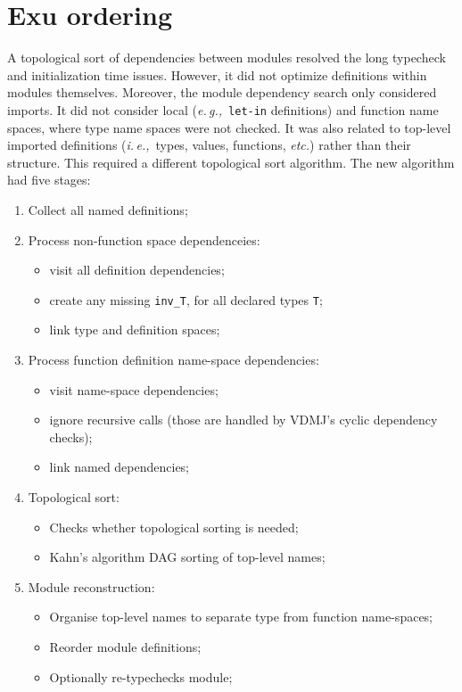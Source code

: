 \documentclass[runningheads,a4paper]{llncs}
\newcommand{\eg}{{\em e.\,g.,\/}}
\newcommand{\ie}{{\em i.\,e.,\/}}
\newcommand{\etc}{{\em etc.\/}}
\begin{document}
\section{Exu ordering}\label{sec:exu}

A topological sort of dependencies between modules resolved the long typecheck and initialization time issues. However, it did not optimize definitions within modules themselves. Moreover, the module dependency search only considered imports. It did not consider local (\eg~\texttt{let-in} definitions) and function name spaces, where type name spaces were not checked. It was also related to top-level imported definitions (\ie~types, values, functions, \etc) rather than their structure.    This required a different topological sort algorithm. The new algorithm had five stages: 
%
\begin{enumerate} 
    \item Collect all named definitions;
    \item Process non-function space dependenceies:
        \begin{itemize}
            \item visit all definition dependencies; 
            \item create any missing \verb'inv_T', for all declared types \verb'T';
            \item link type and definition spaces; 
        \end{itemize}
    \item Process function definition name-space dependencies:
        \begin{itemize}
            \item visit name-space dependencies;
            \item ignore recursive calls (those are  handled by VDMJ's cyclic dependency checks);
            \item link named dependencies;  
        \end{itemize}
    \item Topological sort:
        \begin{itemize}
            \item Checks whether topological sorting is needed;
            \item Kahn's algorithm DAG sorting of top-level names; 
         \end{itemize}
    \item Module reconstruction:
         \begin{itemize}
             \item Organise top-level names to separate type from function name-spaces;  
             \item Reorder module definitions;
             \item Optionally re-typechecks module; 
          \end{itemize}
\end{enumerate}  
\end{document}
